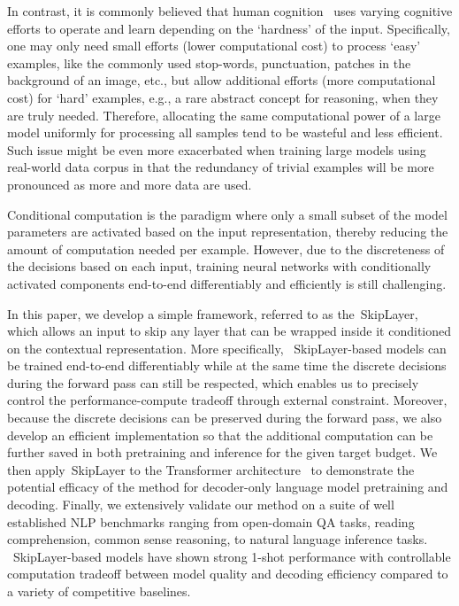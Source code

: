 \documentclass{article}
\newcommand{\skipl}{SkipLayer\xspace}
\begin{document}
In contrast, it is commonly believed that human cognition~\cite{stanovich_west_2000, Levy2008-LEVESC} uses varying cognitive efforts to operate and learn depending on the `hardness' of the input. Specifically, one may only need small efforts (lower computational cost) to process `easy' examples, like the commonly used stop-words, punctuation, patches in the background of an image, etc., but allow additional efforts (more computational cost) for `hard' examples, e.g., a rare abstract concept for reasoning, when they are truly needed. Therefore, allocating the same computational power of a large model uniformly for processing all samples tend to be wasteful and less efficient. Such issue might be even more exacerbated when training large models using real-world data corpus in that the redundancy of trivial examples will be more pronounced as more and more data are used.

Conditional computation \cite{BengioLC13, BengioBPP15} is the paradigm where only a small subset of the model parameters are activated based on the input representation, thereby reducing the amount of computation needed per example. However, due to the discreteness of the decisions based on each input, training neural networks with conditionally activated components end-to-end differentiably and efficiently is still challenging.

In this paper, we develop a simple framework, referred to as the~\skipl, which allows an input to skip any layer that can be wrapped inside it conditioned on the contextual representation. More specifically, ~\skipl-based models can be trained end-to-end differentiably while at the same time the discrete decisions during the forward pass can still be respected, which enables us to precisely control the performance-compute tradeoff through external constraint. Moreover, because the discrete decisions can be preserved during the forward pass, we also develop an efficient implementation so that the additional computation can be further saved in both pretraining and inference for the given target budget. We then apply~\skipl to the Transformer architecture~\cite{vaswani2017attention} to demonstrate the potential efficacy of the method for decoder-only language model pretraining and decoding. Finally, we extensively validate our method on a suite of well established NLP benchmarks ranging from open-domain QA tasks, reading comprehension, common sense reasoning, to natural language inference tasks. ~\skipl-based models have shown strong 1-shot performance with controllable computation tradeoff between model quality and decoding efficiency compared to a variety of competitive baselines.
\end{document}

